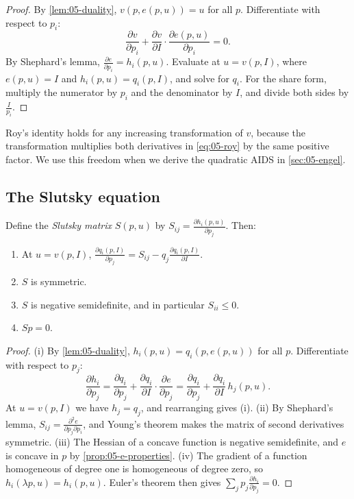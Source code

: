 \begin{proof}
By \cref{lem:05-duality}, $v(p, e(p, u)) = u$ for all $p$. Differentiate with respect to $p_i$:
\begin{equation*}
\frac{\partial v}{\partial p_i} + \frac{\partial v}{\partial I}\cdot\frac{\partial e(p, u)}{\partial p_i} = 0 .
\end{equation*}
By Shephard's lemma, $\frac{\partial e}{\partial p_i} = h_i(p, u)$. Evaluate at $u = v(p, I)$, where
$e(p, u) = I$ and $h_i(p, u) = q_i(p, I)$, and solve for $q_i$. For the share form, multiply the numerator by
$p_i$ and the denominator by $I$, and divide both sides by $\frac{I}{p_i}$.
\end{proof}

Roy's identity holds for any increasing transformation of $v$, because the transformation multiplies both
derivatives in \eqref{eq:05-roy} by the same positive factor. We use this freedom when we
derive the quadratic AIDS in \cref{sec:05-engel}.

\subsection{The Slutsky equation}\label{sec:05-slutsky}

\begin{proposition}\label{prop:05-slutsky}
Define the \emph{Slutsky matrix} $S(p, u)$ by $S_{ij} = \frac{\partial h_i(p, u)}{\partial p_j}$. Then:
\begin{enumerate}[label=(\roman*)]
\item At $u = v(p, I)$, $\frac{\partial q_i(p, I)}{\partial p_j} = S_{ij} - q_j\frac{\partial q_i(p, I)}{\partial I}$.
\item $S$ is symmetric.
\item $S$ is negative semidefinite, and in particular $S_{ii} \leq 0$.
\item $Sp = 0$.
\end{enumerate}
\end{proposition}

\begin{proof}
(i) By \cref{lem:05-duality}, $h_i(p, u) = q_i(p, e(p, u))$ for all $p$. Differentiate with respect to $p_j$:
\begin{equation*}
\frac{\partial h_i}{\partial p_j} = \frac{\partial q_i}{\partial p_j} + \frac{\partial q_i}{\partial I}\cdot
\frac{\partial e}{\partial p_j} = \frac{\partial q_i}{\partial p_j} + \frac{\partial q_i}{\partial I}\,h_j(p,u).
\end{equation*}
At $u = v(p, I)$ we have $h_j = q_j$, and rearranging gives (i). (ii) By Shephard's lemma,
$S_{ij} = \frac{\partial^2 e}{\partial p_j\partial p_i}$, and Young's theorem makes the matrix of second
derivatives symmetric. (iii) The Hessian of a concave function is negative semidefinite, and $e$ is concave
in $p$ by \cref{prop:05-e-properties}. (iv) The gradient of a function homogeneous of degree one is
homogeneous of degree zero, so $h_i(\lambda p, u) = h_i(p, u)$. Euler's theorem then gives
$\sum_j p_j\frac{\partial h_i}{\partial p_j} = 0$.
\end{proof}

